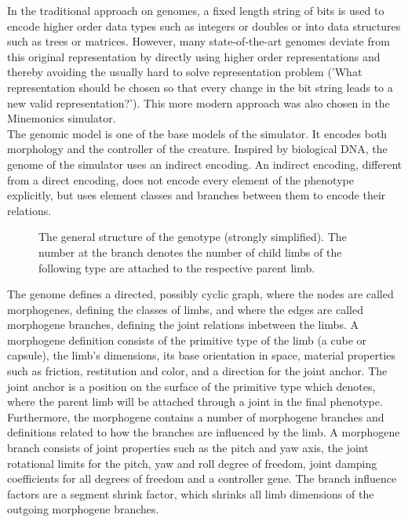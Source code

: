 \documentclass[main]{subfiles}
\begin{document}
In the traditional approach on genomes, a fixed length string of bits is used to encode higher order data types such as integers or doubles or into data structures such as trees or matrices. However, many state-of-the-art genomes deviate from this original representation by directly using higher order representations and thereby avoiding the usually hard to solve representation problem ('What representation should be chosen so that every change in the bit string leads to a new valid representation?'). This more modern approach was also chosen in the Minemonics simulator.\\

The genomic model is one of the base models of the simulator. It encodes both morphology and the controller of the creature. Inspired by biological DNA, the genome of the simulator uses an indirect encoding. An indirect encoding, different from a direct encoding, does not encode every element of the phenotype explicitly, but uses element classes and branches between them to encode their relations. 

\begin{figure}[H]
\center
{}
\caption{The general structure of the genotype (strongly simplified). The number at the branch denotes the number of child limbs of the following type are attached to the respective parent limb.}
\label{figure:genotype}
\end{figure}

The genome defines a directed, possibly cyclic graph, where the nodes are called morphogenes, defining the classes of limbs, and where the edges are called morphogene branches, defining the joint relations inbetween the limbs. A morphogene definition consists of the primitive type of the limb (a cube or capsule), the limb's dimensions, its base orientation in space, material properties such as friction, restitution and color, and a direction for the joint anchor. The joint anchor is a position on the surface of the primitive type which denotes, where the parent limb will be attached through a joint in the final phenotype. Furthermore, the morphogene contains a number of morphogene branches and definitions related to how the branches are influenced by the limb. A morphogene branch consists of joint properties such as the pitch and yaw axis, the joint rotational limits for the pitch, yaw and roll degree of freedom, joint damping coefficients for all degrees of freedom and a controller gene.
The branch influence factors are a segment shrink factor, which shrinks all limb dimensions of the outgoing morphogene branches.
\end{document}
